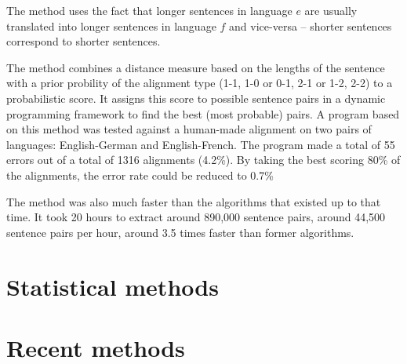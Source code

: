 
The method uses the fact that longer sentences in language \(e\) are usually translated into longer sentences in language \(f\) and vice-versa -- shorter sentences correspond to shorter sentences.

The method combines a distance measure based on the lengths of the sentence with a prior probility of the alignment type (1-1, 1-0 or 0-1, 2-1 or 1-2, 2-2) to a probabilistic score. 
It assigns this score to possible sentence pairs in a dynamic programming framework to find the best (most probable) pairs. 
A program based on this method was tested against a human-made alignment on two pairs of languages: English-German and English-French. 
The program made a total of 55 errors out of a total of 1316 alignments (4.2\%). 
By taking the best scoring 80\% of the alignments, the error rate could be reduced to 0.7\%

The method was also much faster than the algorithms that existed up to that time. 
It took 20 hours to extract around 890,000 sentence pairs, around 44,500 sentence pairs per hour, around 3.5 times faster than former algorithms.


\section{Statistical methods}


\section{Recent methods}